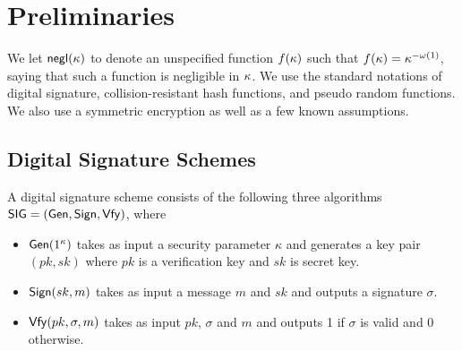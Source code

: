 \section{Preliminaries}\label{sec:pre}
We let ${\mathsf{negl}}(\kappa)$ to denote an unspecified function $f(\kappa)$ such that
$f(\kappa) ={\kappa}^{-\omega(1)}$, saying that such a function is negligible in $\kappa$.
We use the standard notations of digital signature, collision-resistant hash functions, and pseudo random functions.
We also use a symmetric encryption as well as a few known assumptions.

\subsection{Digital Signature Schemes} \label{sec:signature}
A digital signature scheme consists of the following three algorithms $\mathsf{SIG} = (\mathsf{Gen},\mathsf{Sign},\mathsf{Vfy})$, where
\begin{itemize}
 \item{$\mathsf{Gen}(1^{\kappa})$ takes as input a security parameter $\kappa$ and generates a key pair $(pk, sk)$ where $pk$ is a verification key and $sk$ is secret key.}
 \item{$\mathsf{Sign}(sk, m)$ takes as input a message $m$ and $sk$ and outputs a signature $\sigma$.}
 \item{$\mathsf{Vfy}(pk,\sigma,m)$ takes as input $pk$, $\sigma$ and $m$ and outputs 1 if $\sigma$ is valid and 0 otherwise.}
\end{itemize}
